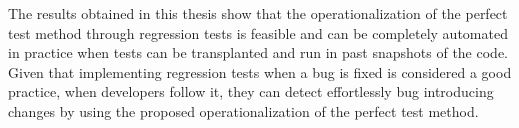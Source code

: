 The results obtained in this thesis show that the operationalization of the perfect test method through regression tests is feasible and can be completely automated in practice when tests can be transplanted and run in past snapshots of the code. 
Given that implementing regression tests when a bug is fixed is considered a good practice, when developers follow it, they can detect effortlessly bug introducing changes by using the proposed operationalization of the perfect test method.



